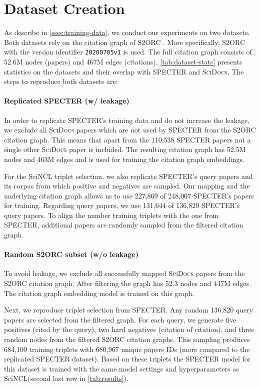 \documentclass[11pt]{article}
\newcommand{\dataset}{\textsc{SciDocs}\xspace}
\newcommand{\sys}{SciNCL\xspace} \newcommand{\baselineCount}{10\xspace}
\begin{document}
\section{Dataset Creation} \label{ssec:dataset-creation}

As describe in \cref{ssec:training-data}, we conduct our experiments on two datasets. 
Both datasets rely on the citation graph of S2ORC \cite{Lo2020}.
More specifically, S2ORC with the version identifier \texttt{20200705v1} is used.
The full citation graph consists of 52.6M nodes (papers) and 467M edges (citations).
\cref{tab:dataset-stats} presents statistics on the datasets and their overlap with SPECTER and \dataset.
The steps to reproduce both datasets are: 

\paragraph{Replicated SPECTER (w/ leakage)}

In order to replicate SPECTER's training data and do not increase the leakage, we exclude all \dataset papers which are not used by SPECTER from the S2ORC citation graph.
This means that apart from the 110,538 SPECTER papers not a single other \dataset paper is included.
The resulting citation graph has 52.5M nodes and 463M edges and is used for training the citation graph embeddings.

For the \sys triplet selection, we also replicate SPECTER's query papers and its corpus from which positive and negatives are sampled. 
Our mapping and the underlying citation graph allows us to use 227,869 of 248,007 SPECTER's papers for training.
Regarding query papers, we use 131,644 of 136,820 SPECTER's query papers.
To align the number training triplets with the one from SPECTER, additional papers are randomly sampled from the filtered citation graph.

\paragraph{Random S2ORC subset (w/o leakage)}

To avoid leakage, we exclude all successfully mapped \dataset papers from the S2ORC citation graph.
After filtering the graph has 52.3 nodes and 447M edges.
The citation graph embedding model is trained on this graph.

Next, we reproduce triplet selection from SPECTER. 
Any random 136,820 query papers are selected from the filtered graph.
For each query, we generate five positives (cited by the query), two hard negatives (citation of citation), and three random nodes from the filtered S2ORC citation graphs.
This sampling produces 684,100 training triplets with 680,967 unique papers IDs (more compared to the replicated SPECTER dataset).
Based on these triplets the SPECTER model for this dataset is trained with the same model settings and hyperparameters as \sys (second last row in \cref{tab:results}).
\end{document}
